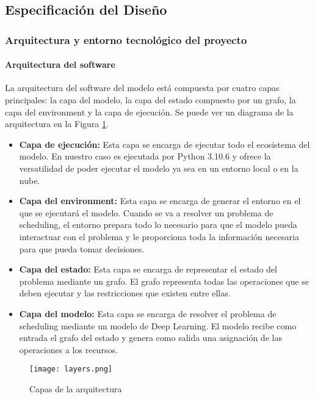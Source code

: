 \subsection{Especificación del Diseño}
\subsubsection{Arquitectura y entorno tecnológico del proyecto}
\paragraph{Arquitectura del software}
La arquitectura del software del modelo está compuesta por cuatro capas principales: 
la capa del modelo, la capa del estado compuesto por un grafo, la capa del 
environment y la capa de ejecución. Se puede ver un diagrama de la arquitectura en la
Figura \ref{fig:layers}.

\begin{itemize}
    \item \textbf{Capa de ejecución:} Esta capa se encarga de ejecutar todo el ecosistema
    del modelo. En nuestro caso es ejecutada por Python 3.10.6 \cite{C8d} y ofrece la versatilidad de
    poder ejecutar el modelo ya sea en un entorno local o en la nube. 
    \item \textbf{Capa del environment:} Esta capa se encarga de generar el entorno en el que se
    ejecutará el modelo. Cuando se va a resolver un problema de scheduling, el entorno
    prepara todo lo necesario para que el modelo pueda interactuar con el problema y le
    proporciona toda la información necesaria para que pueda tomar decisiones.
    \item \textbf{Capa del estado:} Esta capa se encarga de representar el estado del problema
    mediante un grafo. El grafo representa todas las operaciones que se deben ejecutar y
    las restricciones que existen entre ellas.
    \item \textbf{Capa del modelo:} Esta capa se encarga de resolver el problema de scheduling
    mediante un modelo de Deep Learning. El modelo recibe como entrada el grafo del
    estado y genera como salida una asignación de las operaciones a los recursos. 
\end{itemize}

\begin{figure}[ht]
    \centering
    \texttt{[image: layers.png]}
    \caption{Capas de la arquitectura}
    \label{fig:layers}
\end{figure}


